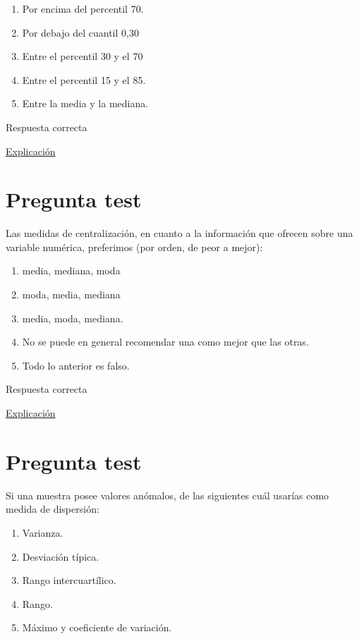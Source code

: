 \documentclass[
]{book}
\providecommand{\tightlist}{%
  \setlength{\itemsep}{0pt}\setlength{\parskip}{0pt}}
\begin{document}
\begin{enumerate}
\def\labelenumi{\alph{enumi})}
\tightlist
\item
  Por encima del percentil 70.
\item
  Por debajo del cuantil 0,30
\item
  Entre el percentil 30 y el 70
\item
  Entre el percentil 15 y el 85.
\item
  Entre la media y la mediana.
\end{enumerate}

Respuesta correcta

\href{https://1fjmanzano.github.io/bioestadistica/distribuciones-de-probabilidad.html\#distribucio\%CC\%81n-normal}{Explicación}

\hypertarget{pregunta-test-47}{%
\section{Pregunta test}\label{pregunta-test-47}}

Las medidas de centralización, en cuanto a la información que ofrecen sobre una variable numérica, preferimos (por orden, de peor a mejor):

\begin{enumerate}
\def\labelenumi{\alph{enumi})}
\tightlist
\item
  media, mediana, moda
\item
  moda, media, mediana
\item
  media, moda, mediana.
\item
  No se puede en general recomendar una como mejor que las otras.
\item
  Todo lo anterior es falso.
\end{enumerate}

Respuesta correcta

\href{https://1fjmanzano.github.io/bioestadistica/medidas-de-posicio\%CC\%81n-dispersio\%CC\%81n-y-forma.html\#medidas-de-posicio\%CC\%81n-centrales}{Explicación}

\hypertarget{pregunta-test-48}{%
\section{Pregunta test}\label{pregunta-test-48}}

Si una muestra posee valores anómalos, de las siguientes cuál usarías como medida de dispersión:

\begin{enumerate}
\def\labelenumi{\alph{enumi})}
\tightlist
\item
  Varianza.
\item
  Desviación típica.
\item
  Rango intercuartílico.
\item
  Rango.
\item
  Máximo y coeficiente de variación.
\end{enumerate}
\end{document}
